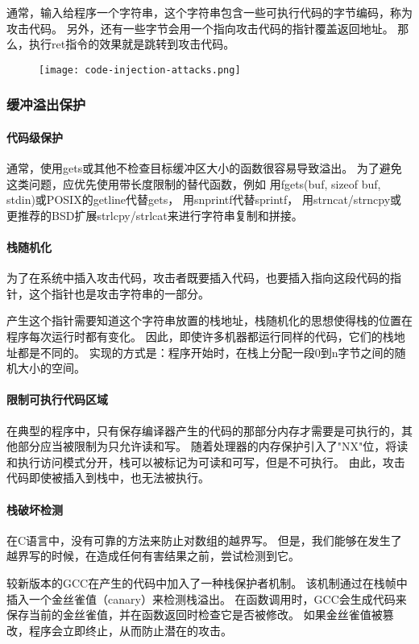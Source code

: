 通常，输入给程序一个字符串，这个字符串包含一些可执行代码的字节编码，称为攻击代码。
另外，还有一些字节会用一个指向攻击代码的指针覆盖返回地址。
那么，执行ret指令的效果就是跳转到攻击代码。
\begin{figure}[H]
    \centering
    \texttt{[image: code-injection-attacks.png]}
\end{figure}

\subsubsection{缓冲溢出保护}
\paragraph{代码级保护}
通常，使用gets或其他不检查目标缓冲区大小的函数很容易导致溢出。
为了避免这类问题，应优先使用带长度限制的替代函数，例如
用fgets(buf, sizeof buf, stdin)或POSIX的getline代替gets，
用snprintf代替sprintf，
用strncat/strncpy或更推荐的BSD扩展strlcpy/strlcat来进行字符串复制和拼接。

\paragraph{栈随机化}
为了在系统中插入攻击代码，攻击者既要插入代码，也要插入指向这段代码的指针，这个指针也是攻击字符串的一部分。

产生这个指针需要知道这个字符串放置的栈地址，栈随机化的思想使得栈的位置在程序每次运行时都有变化。
因此，即使许多机器都运行同样的代码，它们的栈地址都是不同的。
实现的方式是：程序开始时，在栈上分配一段0到n字节之间的随机大小的空间。

\paragraph{限制可执行代码区域}
在典型的程序中，只有保存编译器产生的代码的那部分内存才需要是可执行的，其他部分应当被限制为只允许读和写。
随着处理器的内存保护引入了"NX"位，将读和执行访问模式分开，栈可以被标记为可读和可写，但是不可执行。
由此，攻击代码即使被插入到栈中，也无法被执行。

\paragraph{栈破坏检测}
在C语言中，没有可靠的方法来防止对数组的越界写。
但是，我们能够在发生了越界写的时候，在造成任何有害结果之前，尝试检测到它。

较新版本的GCC在产生的代码中加入了一种栈保护者机制。
该机制通过在栈帧中插入一个金丝雀值（canary）来检测栈溢出。
在函数调用时，GCC会生成代码来保存当前的金丝雀值，并在函数返回时检查它是否被修改。
如果金丝雀值被篡改，程序会立即终止，从而防止潜在的攻击。

